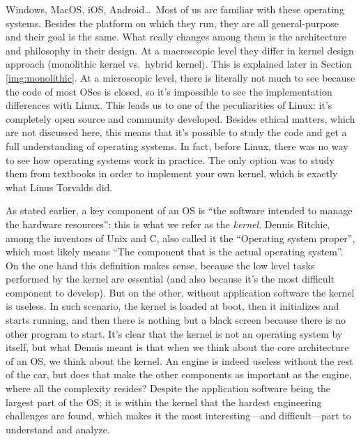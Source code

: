 Windows, MacOS, iOS, Android\dots\   Most of us are familiar with these operating systems. Besides the platform on which they run, they are all general-purpose and their goal is the same. What really changes among them is the architecture and philosophy in their design. At a macroscopic level they differ in kernel design approach (monolithic kernel vs.\ hybrid kernel). This is explained later in Section \ref{img:monolithic}. At a microscopic level, there is literally not much to see because the code of most OSes is closed, so it's impossible to see the implementation differences with Linux. This leads us to one of the peculiarities of Linux: it's completely open source and community developed. Besides ethical matters, which are not discussed here, this means that it's possible to study the code and get a full understanding of operating systems. In fact, before Linux, there was no way to see how operating systems work in practice. The only option was to study them from textbooks in order to implement your own kernel, which is exactly what Linus Torvalds did.

As stated earlier, a key component of an OS is ``the software intended to manage the hardware resources'': this is what we refer as the \textit{kernel}. Dennis Ritchie, among the inventors of Unix and C, also called it the ``Operating system proper''\cite{ritchie}, which most likely means ``The component that is the actual operating system''. On the one hand this definition makes sense, because the low level tasks performed by the kernel are essential (and also because it's the most difficult component to develop). But on the other, without application software the kernel is useless. In such scenario, the kernel is loaded at boot, then it initializes and starts running, and then there is nothing but a black screen because there is no other program to start. It's clear that the kernel is not an operating system by itself, but what Dennis meant is that when we think about the core architecture of an OS, we think about the kernel. An engine is indeed useless without the rest of the car, but does that make the other components as important as the engine, where all the complexity resides? Despite the application software being the largest part of the OS; it is within the kernel that the hardest engineering challenges are found, which makes it the most interesting---and difficult---part to understand and analyze.

